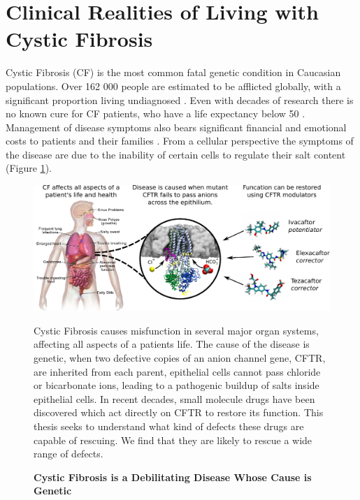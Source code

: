 



\section{Clinical Realities of Living with Cystic Fibrosis}
Cystic Fibrosis (CF) is the most common fatal genetic condition in Caucasian populations. Over 162 000 people are estimated to be afflicted globally, with a significant proportion living undiagnosed \cite{hammoudeh2021,guo2022}. Even with decades of research there is no known cure for CF patients, who have a life expectancy below 50 \cite{mcbennett2022}. Management of disease symptoms also bears significant financial and emotional costs to patients and their families \cite{vangool2013, page2022}. From a cellular perspective the symptoms of the disease are due to the inability of certain cells to regulate their salt content (Figure \ref{CF_summary}). 

\begin{figure}
	\label{CF_summary}
	\begin{center}
	\includegraphics[width=1\textwidth]{figures/cf_summary_fig.pdf}
	\end{center}
	\captionsetup{singlelinecheck = false, justification=raggedright}
	\caption[Cystic Fibrosis is a Debilitating Disease Whose Cause is Genetic] {\textbf{Cystic Fibrosis is a Debilitating Disease Whose Cause is Genetic}}{Cystic Fibrosis causes misfunction in several major organ systems, affecting all aspects of a patients life. The cause of the disease is genetic, when two defective copies of an anion channel gene, CFTR, are inherited from each parent, epithelial cells cannot pass chloride or bicarbonate ions, leading to a pathogenic buildup of salts inside epithelial cells. In recent decades, small molecule drugs have been discovered which act directly on CFTR to restore its function. This thesis seeks to understand what kind of defects these drugs are capable of rescuing. We find that they are likely to rescue a wide range of defects.} 
\end{figure}

